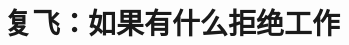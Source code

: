 
\ifchinese
\chapter{{\\}复飞：如果有什么拒绝工作}
\fi
\iffalse
\IfLanguageName{english}{
\chapter{Missed approach: If anything refuses to work}
}{}
\IfLanguageName{french}{
\chapter{Approche manqu\'{e}e : si rien ne fonctionne}
}{}
\fi
\label{missed}
\ifchinese
{}
\fi
\iffalse
\IfLanguageName{english}{
\markboth{\thechapter.\hspace*{1mm} MISSED APPROACH}{\thesection\hspace*{1mm} ???}
}{}
\IfLanguageName{french}{
\markboth{\thechapter.\hspace*{1mm} APPROCHE MANQUEE}{\thesection\hspace*{1mm} ???}
}{}
\fi

